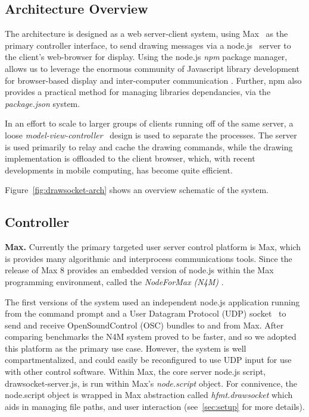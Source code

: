 \subsection{Architecture Overview}
The \drawsocket architecture is designed as a web server-client system, using Max~\cite{puckette:max} as the primary controller interface, to send drawing messages via a node.js~\cite{tilkov2010node} server to the client's web-browser for display. 
Using the node.js \textit{npm} package manager, allows us to leverage the enormous community of Javascript library development for browser-based display and inter-computer communication \cite{trockman2018adding}. 
Further, npm also provides a practical method for managing libraries dependancies, via the \textit{package.json} system.

In an effort to scale to larger groups of clients running off of the same server, a loose \textit{model-view-controller}~\cite{krasner1988description} design is used to separate the processes. 
The server is used primarily to relay and cache the drawing commands, while the drawing implementation is offloaded to the client browser, which, with recent developments in mobile computing, has become quite efficient. \cite{halpern2016mobile} 

Figure~\ref{fig:drawsocket-arch} shows an overview schematic of the system. 

\subsection{Controller}

\medskip
\noindent
\textbf{Max.}
Currently the primary targeted user server control platform is Max, which is provides many algorithmic and interprocess communications tools. 
Since the release of Max 8 provides an embedded version of node.js within the Max programming environment, called the \textit{NodeForMax (N4M)} \cite{nodeformax}.

The first versions of the \drawsocket system used an independent node.js application running from the command prompt and a User Datagram Protocol (UDP) socket~\cite{postel1980user} to send and receive OpenSoundControl (OSC) \cite{wright:osc} bundles to and from Max.
After comparing benchmarks the N4M system proved to be faster, and so we adopted this platform as the primary use case.
However, the \drawsocket system is well compartmentalized, and could easily be reconfigured to use UDP input for use with other control software.
Within Max, the core server node.js script, drawsocket-server.js, is run within Max's \textit{node.script} object. For connivence, the node.script object is wrapped in Max abstraction called \textit{hfmt.drawsocket} which aids in managing file paths, and user interaction (see~\ref{sec:setup} for more details).

